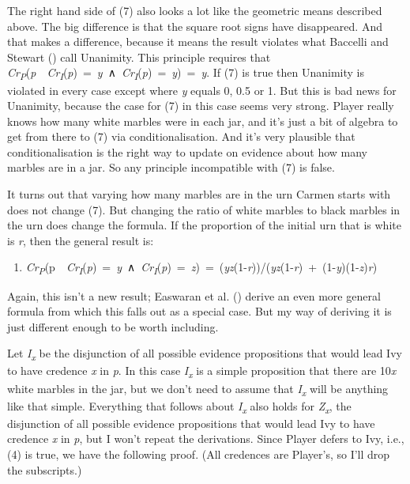 \documentclass[
  10pt,
  letterpaper,
  DIV=11,
  numbers=noendperiod,
  twoside]{scrartcl}
\providecommand{\tightlist}{%
  \setlength{\itemsep}{0pt}\setlength{\parskip}{0pt}}\usepackage{longtable,booktabs,array}
\begin{document}
The right hand side of (7) also looks a lot like the geometric means
described above. The big difference is that the square root signs have
disappeared. And that makes a difference, because it means the result
violates what Baccelli and Stewart
() call Unanimity. This
principle requires that
\emph{Cr\textsubscript{P}}(\emph{p}~\textbar~\emph{Cr\textsubscript{I}}(\emph{p})~=~\emph{y}~∧~\emph{Cr\textsubscript{I}}(\emph{p})~=~\emph{y})~=~\emph{y}.
If (7) is true then Unanimity is violated in every case except where
\emph{y} equals 0, 0.5 or 1. But this is bad news for Unanimity, because
the case for (7) in this case seems very strong. Player really knows how
many white marbles were in each jar, and it's just a bit of algebra to
get from there to (7) via conditionalisation. And it's very plausible
that conditionalisation is the right way to update on evidence about how
many marbles are in a jar. So any principle incompatible with (7) is
false.

It turns out that varying how many marbles are in the urn Carmen starts
with does not change (7). But changing the ratio of white marbles to
black marbles in the urn does change the formula. If the proportion of
the initial urn that is white is \emph{r}, then the general result is:

\begin{enumerate}
\def\labelenumi{(\arabic{enumi})}
\setcounter{enumi}{7}
\tightlist
\item
  \emph{Cr\textsubscript{P}}(p~\textbar~\emph{Cr\textsubscript{I}}(\emph{p})~=~\emph{y}~∧~\emph{Cr\textsubscript{I}}(\emph{p})~=~\emph{z})~=~(\emph{yz}(1-\emph{r}))/(\emph{yz}(1-\emph{r})~+~(1-\emph{y})(1-\emph{z})\emph{r})
\end{enumerate}

Again, this isn't a new result; Easwaran et al.
() derive an even more general
formula from which this falls out as a special case. But my way of
deriving it is just different enough to be worth including.

Let \emph{I\textsubscript{x}} be the disjunction of all possible
evidence propositions that would lead Ivy to have credence \emph{x} in
\emph{p}. In this case \emph{I\textsubscript{x}} is a simple proposition
that there are 10\emph{x} white marbles in the jar, but we don't need to
assume that \emph{I\textsubscript{x}} will be anything like that simple.
Everything that follows about \emph{I\textsubscript{x}} also holds for
\emph{Z\textsubscript{x}}, the disjunction of all possible evidence
propositions that would lead Ivy to have credence \emph{x} in \emph{p},
but I won't repeat the derivations. Since Player defers to Ivy, i.e.,
(4) is true, we have the following proof. (All credences are Player's,
so I'll drop the subscripts.)
\end{document}
